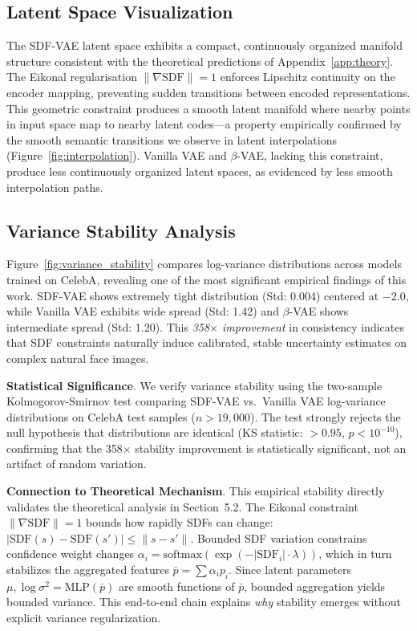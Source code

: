 \documentclass[10pt,twocolumn,letterpaper]{article}
\begin{document}
\subsection{Latent Space Visualization}

The SDF-VAE latent space exhibits a compact, continuously organized manifold structure consistent with the theoretical predictions of Appendix~\ref{app:theory}. The Eikonal regularisation $\|\nabla\text{SDF}\| = 1$ enforces Lipschitz continuity on the encoder mapping, preventing sudden transitions between encoded representations. This geometric constraint produces a smooth latent manifold where nearby points in input space map to nearby latent codes---a property empirically confirmed by the smooth semantic transitions we observe in latent interpolations (Figure~\ref{fig:interpolation}). Vanilla VAE and $\beta$-VAE, lacking this constraint, produce less continuously organized latent spaces, as evidenced by less smooth interpolation paths.

\subsection{Variance Stability Analysis}

Figure~\ref{fig:variance_stability} compares log-variance distributions across models trained on CelebA, revealing one of the most significant empirical findings of this work. SDF-VAE shows extremely tight distribution (Std: 0.004) centered at $-2.0$, while Vanilla VAE exhibits wide spread (Std: 1.42) and $\beta$-VAE shows intermediate spread (Std: 1.20). This \textit{358$\times$ improvement} in consistency indicates that SDF constraints naturally induce calibrated, stable uncertainty estimates on complex natural face images.

\textbf{Statistical Significance}. We verify variance stability using the two-sample Kolmogorov-Smirnov test comparing SDF-VAE vs.\ Vanilla VAE log-variance distributions on CelebA test samples ($n > 19{,}000$). The test strongly rejects the null hypothesis that distributions are identical (KS statistic: $> 0.95$, $p < 10^{-10}$), confirming that the 358$\times$ stability improvement is statistically significant, not an artifact of random variation.

\textbf{Connection to Theoretical Mechanism}. This empirical stability directly validates the theoretical analysis in Section~5.2. The Eikonal constraint $\|\nabla \text{SDF}\| = 1$ bounds how rapidly SDFs can change: $|\text{SDF}(s) - \text{SDF}(s')| \leq \|s - s'\|$. Bounded SDF variation constrains confidence weight changes $\alpha_i = \text{softmax}(\exp(-|\text{SDF}_i| \cdot \lambda))$, which in turn stabilizes the aggregated features $\bar{p} = \sum \alpha_i p_i$. Since latent parameters $\mu, \log \sigma^2 = \text{MLP}(\bar{p})$ are smooth functions of $\bar{p}$, bounded aggregation yields bounded variance. This end-to-end chain explains \textit{why} stability emerges without explicit variance regularization.
\end{document}
